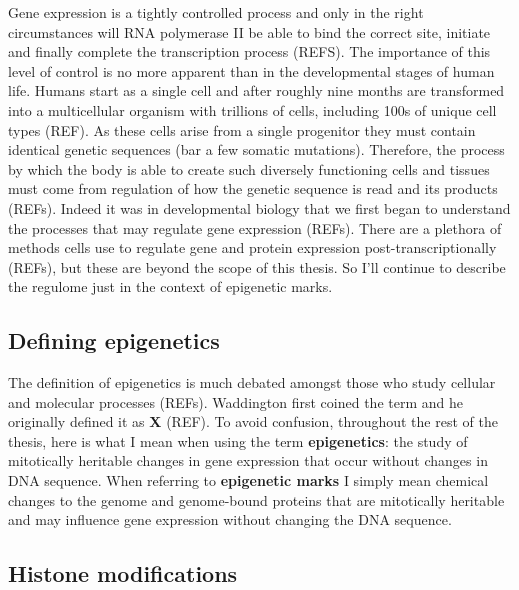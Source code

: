 \documentclass[11pt,twoside]{bristolthesis}
\begin{document}
Gene expression is a tightly controlled process and only in the right circumstances will RNA polymerase II be able to bind the correct site, initiate and finally complete the transcription process (REFS). The importance of this level of control is no more apparent than in the developmental stages of human life. Humans start as a single cell and after roughly nine months are transformed into a multicellular organism with trillions of cells, including 100s of unique cell types (REF). As these cells arise from a single progenitor they must contain identical genetic sequences (bar a few somatic mutations). Therefore, the process by which the body is able to create such diversely functioning cells and tissues must come from regulation of how the genetic sequence is read and its products (REFs). Indeed it was in developmental biology that we first began to understand the processes that may regulate gene expression (REFs). There are a plethora of methods cells use to regulate gene and protein expression post-transcriptionally (REFs), but these are beyond the scope of this thesis. So I'll continue to describe the regulome just in the context of epigenetic marks.

\hypertarget{defining-epigenetics}{%
\subsection{Defining epigenetics}\label{defining-epigenetics}}

The definition of epigenetics is much debated amongst those who study cellular and molecular processes (REFs). Waddington first coined the term and he originally defined it as \textbf{X} (REF). To avoid confusion, throughout the rest of the thesis, here is what I mean when using the term \textbf{epigenetics}: the study of mitotically heritable changes in gene expression that occur without changes in DNA sequence. When referring to \textbf{epigenetic marks} I simply mean chemical changes to the genome and genome-bound proteins that are mitotically heritable and may influence gene expression without changing the DNA sequence.

\hypertarget{histone-modifications}{%
\subsection{Histone modifications}\label{histone-modifications}}
\end{document}
